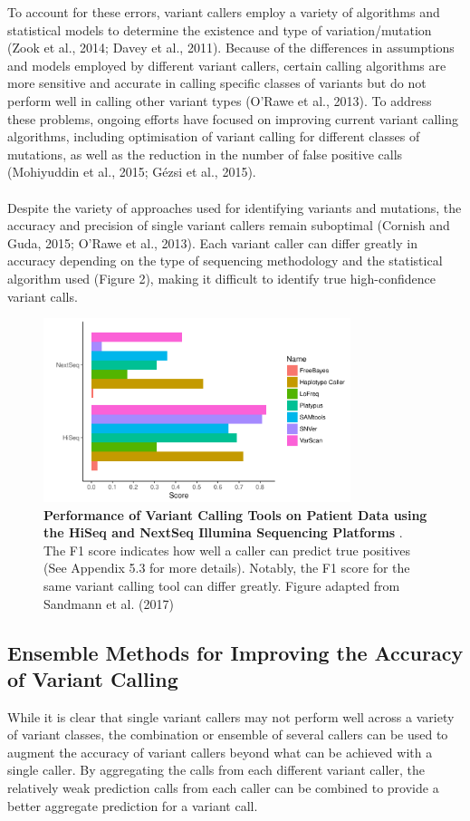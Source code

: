 \documentclass{article}
\begin{document}
To account for these errors, variant callers employ a variety of algorithms and statistical models to determine the existence and type of variation/mutation (Zook et al., 2014; Davey et al., 2011). Because of the differences in assumptions and models employed by different variant callers, certain calling algorithms are more sensitive and accurate in calling specific classes of variants but do not perform well in calling other variant types (O'Rawe et al., 2013). To address these problems, ongoing efforts have focused on improving current variant calling algorithms, including optimisation of variant calling for different classes of mutations, as well as the reduction in the number of false positive calls (Mohiyuddin et al., 2015; Gézsi et al., 2015).\\\\ 
Despite the variety of approaches used for identifying variants and mutations,  the accuracy and precision of single variant callers remain suboptimal (Cornish and Guda, 2015; O'Rawe et al., 2013). Each variant caller can differ greatly in accuracy depending on the type of sequencing methodology and the statistical algorithm used (Figure 2), making it difficult to identify true high-confidence variant calls.
\begin{figure}[H]
\includegraphics[width=0.8\textwidth]{f1scorerealdatasets_v2.pdf}
\centering
\caption{\textbf{Performance of Variant Calling Tools on Patient Data using the HiSeq and NextSeq Illumina Sequencing Platforms }. The F1 score indicates how well a caller can predict true positives (See Appendix 5.3 for more details). Notably, the F1 score for the same variant calling tool can differ greatly. Figure adapted from Sandmann et al. (2017)}
\end{figure}
\subsection{Ensemble Methods for Improving the Accuracy of Variant Calling} 
While it is clear that single variant callers may not perform well across a variety of variant classes, the combination or ensemble of several callers can be used to augment the accuracy of variant callers beyond what can be achieved with a single caller. By aggregating the calls from each different variant caller, the relatively weak prediction calls from each caller can be combined to provide a better aggregate prediction for a variant call. 
\end{document}
